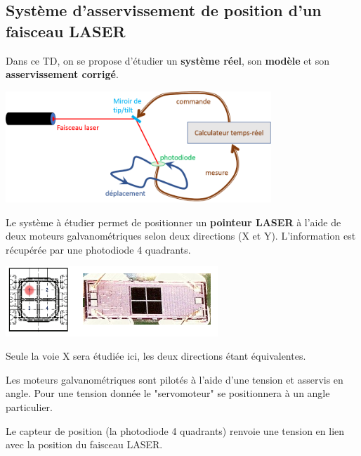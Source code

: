 \documentclass[a4paper,french]{paper}
\author{Julien VILLEMEJANE}
\subtitle{TD 5}
\title{\titre}
\begin{document}
 
\enteteThematiqueObligatoire{}

\vspace{-1cm}


\subsection*{Système d'asservissement de position d'un faisceau LASER}

Dans ce TD, on se propose d'étudier un \textbf{système réel}, son \textbf{modèle} et son \textbf{asservissement corrigé}.

\begin{center}
	\includegraphics[width=10cm]{images/TD/systBoucle.png}
\end{center}


Le système à étudier permet de positionner un \textbf{pointeur LASER} à l'aide de deux moteurs galvanométriques selon deux directions (X et Y). L'information est récupérée par une photodiode 4 quadrants.

\begin{center}
	\includegraphics[width=8cm]{images/TD/4q_photodiode.png}
\end{center}

Seule la voie X sera étudiée ici, les deux directions étant équivalentes.

Les moteurs galvanométriques sont pilotés à l'aide d'une tension et asservis en angle. Pour une tension donnée le "servomoteur" se positionnera à un angle particulier.

Le capteur de position (la photodiode 4 quadrants) renvoie une tension en lien avec la position du faisceau LASER.
\end{document}
